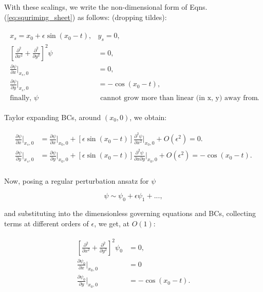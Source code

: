 \documentclass{article}
\begin{document}
With these scalings, we write the non-dimensional form of Eqns.(\ref{eq:squriming_sheet}) as follows: (dropping tildes):

\begin{align}\label{eq:dimless_gov_eqn_bcs}
 \begin{split}
  x_{s} = x_{0} + \epsilon \sin{(x_{0} - t)},& y_{s} = 0,\\
  \left[\frac{\partial^{2}}{\partial x^{2}} + \frac{\partial^{2}}{\partial y^{2}}\right]^{2} \psi &= 0, \\
  \frac{\partial \psi}{\partial x }\bigg|_{x_{s}, 0} & = 0, \\
  \frac{\partial \psi}{\partial y }\bigg|_{x_{s}, 0} &= -  \cos{(x_{0} - t)},\\
  \textrm{finally, } \psi & \textrm{ cannot grow more than linear (in x, y) away from the sheet}.
 \end{split}
\end{align}

Taylor expanding BCs, around $(x_{0}, 0)$, we obtain:

\begin{align}\label{eq:taylor_exp_bcs}
\begin{split}
 \frac{\partial \psi}{\partial x }\bigg|_{x_{s}, 0} & =  \frac{\partial \psi}{\partial x }\bigg|_{x_{0}, 0} + [\epsilon \sin{(x_{0} - t)}] \frac{\partial^{2} \psi}{\partial x^{2} }\bigg|_{x_{0}, 0}+ O(\epsilon^{2}) = 0.\\
 \frac{\partial \psi}{\partial y }\bigg|_{x_{s}, 0} & = \frac{\partial \psi}{\partial y }\bigg|_{x_{0}, 0} + [\epsilon \sin{(x_{0} - t)} ]\frac{\partial^{2} \psi}{\partial x \partial y }\bigg|_{x_{0}, 0}+ O(\epsilon^{2}) = -  \cos{(x_{0} - t)}.\\
\end{split}
\end{align}

Now, posing a regular perturbation ansatz for $\psi$

\begin{equation}\label{eq:reg_perturb}
 \psi \sim \psi_{0} + \epsilon \psi_{1} + ...,
\end{equation}

and substituting into the dimensionless governing equations and BCs, collecting terms at different orders of $\epsilon$, we get, at $O(1)$:

\begin{align}\label{eq:psi0_eqn}
 \begin{split}
  \left[\frac{\partial^{2}}{\partial x^{2}} + \frac{\partial^{2}}{\partial y^{2}}\right]^{2} \psi_{0} &= 0,\\
 \frac{\partial \psi_{0}}{\partial x }\bigg|_{x_{0}, 0} & = 0\\
 \frac{\partial \psi_{0}}{\partial y }\bigg|_{x_{0}, 0} & = -  \cos{(x_{0} - t)}.
 \end{split}
\end{align}
\end{document}
